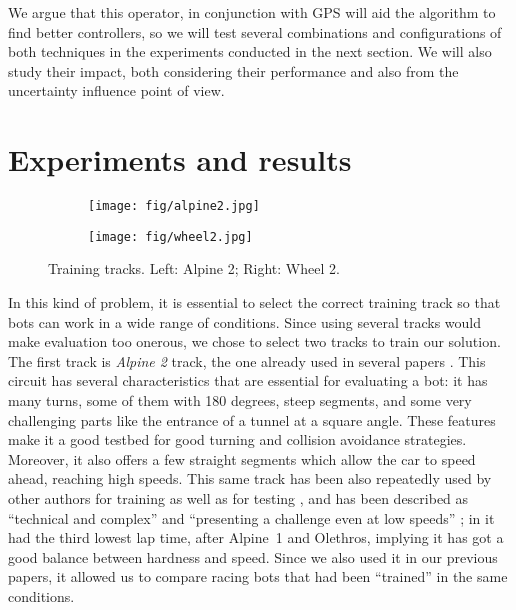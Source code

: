\documentclass[10pt,journal,compsoc]{IEEEtran}
\begin{document}
We argue that this operator, in conjunction with GPS will aid the
algorithm to find better controllers, so we will test several
combinations and configurations of both techniques in the experiments
conducted in the next section. We will also study their impact, both considering their performance and also from the uncertainty influence point of view. 
\section{Experiments and results}  
\label{sec:results}

\begin{figure}[!ht]	
\centering
\begin{subfigure}[b]{0.15\textwidth}
	\centering
	\texttt{[image: fig/alpine2.jpg]}
	\label{fig:alpine2}
\end{subfigure}
\hfill
\begin{subfigure}[b]{0.15\textwidth}
	\centering
	\texttt{[image: fig/wheel2.jpg]}
	\label{fig:wheel2}
\end{subfigure}
\caption{Training tracks. Left: Alpine 2; Right: Wheel 2.}
\label{fig:alpine2_wheel2track}
\end{figure}

In this kind of problem, it is essential to select the correct
training track so that bots can work in a wide range of
conditions. Since using several tracks would make evaluation too onerous, we chose to select two tracks to train our solution. The first track is \textit{Alpine 2} track, the one already used in several papers  \cite{salem_cig2018,DBLP:conf/cig/SalemMG19}. This circuit has several characteristics that
are essential for evaluating a bot: it has many turns, some of
them with 180 degrees, steep segments, and some very challenging parts
like the entrance of a tunnel at a square angle. These features make
it a good testbed for good turning and collision avoidance
strategies. Moreover, it also offers a few straight segments which allow the car to speed ahead, reaching high speeds. This same track has been also repeatedly used by other authors for training as well as for testing \cite{cardamone2010applying}, and has been described as ``technical and complex'' \cite{AG} and ``presenting a challenge even at low speeds'' \cite{vrajitoru2018global}; in \cite{AG} it had the third lowest lap time, after \mbox{Alpine 1} and Olethros, implying it has got a good balance between hardness and speed. Since we also used it in our previous papers, it allowed us to compare racing bots that had been ``trained'' in the same conditions.
\end{document}
